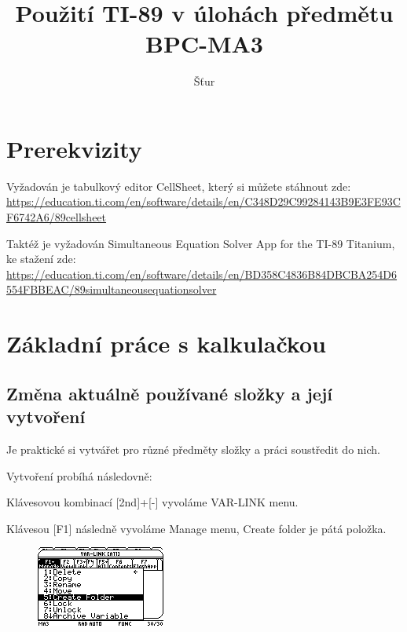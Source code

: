 \documentclass[10pt,a4paper,float]{article}
\author{Šťur}
\title{Použití TI-89 v úlohách předmětu BPC-MA3}
\begin{document}
\maketitle

\pagebreak

\tableofcontents

\pagebreak

\section{Prerekvizity}
\label{sec:pre}
Vyžadován je tabulkový editor CellSheet, který si můžete stáhnout zde:\\ \url{https://education.ti.com/en/software/details/en/C348D29C99284143B9E3FE93CF6742A6/89cellsheet}

Taktéž je vyžadován Simultaneous Equation Solver App for the TI-89 Titanium, ke stažení zde:\\ \url{https://education.ti.com/en/software/details/en/BD358C4836B84DBCBA254D6554FBBEAC/89simultaneousequationsolver}

\section{Základní práce s kalkulačkou}
\label{sec:zaklady}
\subsection{Změna aktuálně používané složky a její vytvoření}
\label{ssec:slozky}
Je praktické si vytvářet pro různé předměty složky a práci soustředit do nich.

Vytvoření probíhá následovně:

Klávesovou kombinací [2nd]+[-] vyvoláme VAR-LINK menu.

Klávesou [F1] následně vyvoláme Manage menu, Create folder je pátá položka.

\begin{figure}[H]
	\centering
	\includegraphics[width=.5\textwidth]{img/CREATEFOLDER}
\end{figure}
\end{document}

